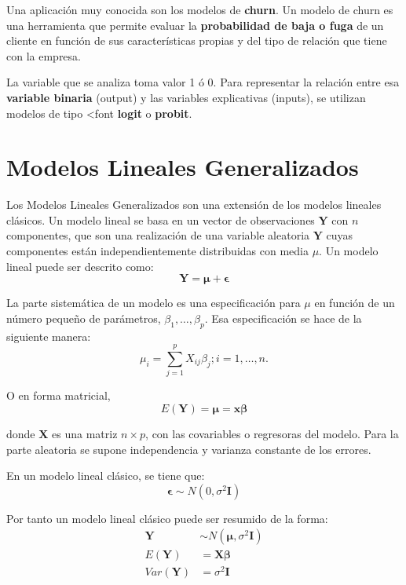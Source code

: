 \documentclass[]{book}
\begin{document}
Una aplicación muy conocida son los modelos de \textbf{churn}. Un modelo de churn es una herramienta que permite evaluar la \textbf{probabilidad de baja o fuga} de un cliente en función de sus características propias y del tipo de relación que tiene con la empresa.

La variable que se analiza toma valor 1 ó 0. Para representar la relación entre esa \textbf{variable binaria} (output) y las variables explicativas (inputs), se utilizan modelos de tipo \textless{}font \textbf{logit} o \textbf{probit}.

\hypertarget{modelos-lineales-generalizados}{%
\section{Modelos Lineales Generalizados}\label{modelos-lineales-generalizados}}

Los Modelos Lineales Generalizados son una extensión de los modelos lineales
clásicos. Un modelo lineal se basa en un vector de observaciones \(\mathbf{Y}\) con \(n\) componentes,
que son una realización de una variable aleatoria \(\mathbf{Y}\) cuyas componentes están independientemente distribuidas con media \(\mu\). Un modelo lineal puede ser descrito
como:
\[\mathbf{Y} = \mathbf{\mu} + \mathbf{\epsilon}\]

La parte sistemática de un modelo es una especificación para \(\mu\) en función de un número pequeño de parámetros, \(\beta_1, \ldots, \beta_p.\) Esa especificación se hace de la siguiente manera:
\[
\mu_i = \sum_{j=1}^p  X_{ij}\beta_j;     i=1,\ldots,n.
\]

O en forma matricial,
\[
E(\mathbf{Y}) = \mathbf{\mu} = \mathbf{x} \mathbf{\beta}
\]

donde \(\mathbf{X}\) es una matriz \(n \times p\), con las covariables o regresoras del modelo. Para la parte aleatoria se supone independencia y varianza constante de los errores.

En un modelo lineal clásico, se tiene que:
\[
\mathbf{\epsilon} \sim N(0, \sigma^2 \mathbf{I})
\]

Por tanto un modelo lineal clásico puede ser resumido de la forma:
\[
\begin{align}
        \mathbf{Y} & \sim N(\mathbf{\mu}, \sigma^2 \mathbf{I}) \\
        E(\mathbf{Y}) & = \mathbf{X}\mathbf{\beta} \\
        Var(\mathbf{Y}) & =  \sigma^2\mathbf{I}
\end{align}
\]
\end{document}
